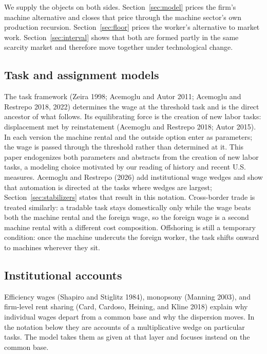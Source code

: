 \documentclass[12pt]{article}
\theoremstyle{plain}
\begin{document}
We supply the objects on both sides. Section~\ref{sec:model} prices the firm's
machine alternative and closes that price through the machine sector's own
production recursion. Section~\ref{sec:floor} prices the worker's alternative
to market work. Section~\ref{sec:interval} shows that both are formed partly in
the same scarcity market and therefore move together under technological change.

\subsection{Task and assignment models}\label{sec:tasks}

The task framework (Zeira 1998; Acemoglu and Autor 2011; Acemoglu and Restrepo 2018, 2022) determines the wage at the threshold task and is the direct ancestor of what follows. Its equilibrating force is the creation of new labor tasks: displacement met by reinstatement (Acemoglu and Restrepo 2018; Autor 2015). In each version the machine rental and the outside option enter as parameters; the wage is passed through the threshold rather than determined at it. This paper endogenizes both parameters and abstracts from the creation of new labor tasks, a modeling choice motivated by our reading of history and recent U.S. measures. Acemoglu and Restrepo (2026) add institutional wage wedges and show that automation is directed at the tasks where wedges are largest; Section~\ref{sec:stabilizers} states that result in this notation. Cross-border trade is treated similarly: a tradable task stays domestically only while the wage beats both the machine rental and the foreign wage, so the foreign wage is a second machine rental with a different cost composition. Offshoring is still a temporary condition: once the machine undercuts the foreign worker, the task shifts onward to machines wherever they sit.

\subsection{Institutional accounts}\label{sec:institutions}

Efficiency wages (Shapiro and Stiglitz 1984), monopsony (Manning 2003), and firm-level rent sharing (Card, Cardoso, Heining, and Kline 2018) explain why individual wages depart from a common base and why the dispersion moves. In the notation below they are accounts of a multiplicative wedge on particular tasks. The model takes them as given at that layer and focuses instead on the common base.
\end{document}
